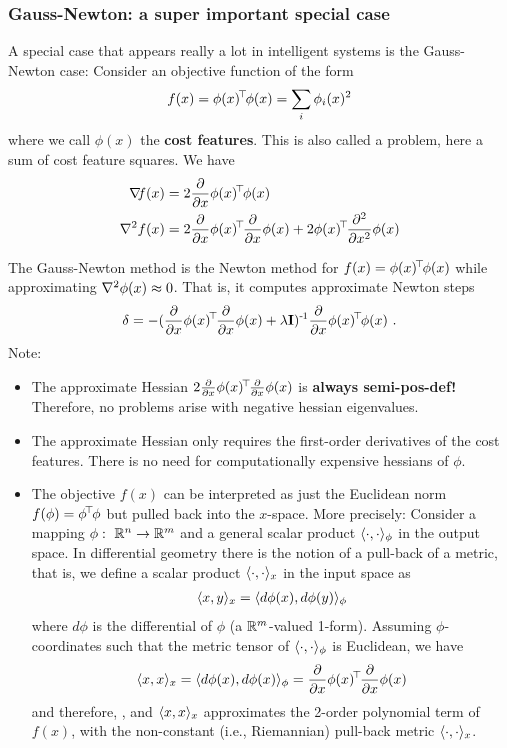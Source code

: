 \subsubsection{Gauss-Newton: a super important special case}

A special case that appears really a lot in intelligent systems is the
Gauss-Newton case: Consider an objective function of the form
\begin{align}
f(x) = \phi(x)^{\!\top\!} \phi(x) = \sum_i \phi_i(x)^2
\end{align}
where we call $\phi(x)$ the \textbf{cost features}. This is also
called a  problem, here a sum of cost feature
squares. We have
\begin{align}
\na f(x)
 &= 2 \Del{x}\phi(x)^\T \phi(x) \\
\he f(x)
 &= 2 \Del{x}\phi(x)^\T \Del{x}\phi(x) +
 2 \phi(x)^\T \Hes{x}\phi(x)
\end{align}

The Gauss-Newton method is the Newton method for         
$f(x) = \phi(x)^{\!\top\!} \phi(x)$ while approximating ${\nabla_{\!\!}^2} \phi(x)\approx
0$. That is, it computes approximate Newton steps 
\begin{equation}
{\delta} = - (\frac{\partial}{\partial x}\phi(x)^{\!\top\!} \frac{\partial}{\partial x}\phi(x) + \lambda {\rm\bf I})^{{\hspace*{-.0pt}\text{\rm -}\hspace*{-.5pt}}1} \frac{\partial}{\partial x}\phi(x)^{\!\top\!} \phi(x) ~.
\end{equation}
Note:
\begin{itemize}
\item The approximate Hessian $2\frac{\partial}{\partial x}\phi(x)^{\!\top\!} \frac{\partial}{\partial x}\phi(x)$
is \textbf{always semi-pos-def!} Therefore, no problems arise with
negative hessian eigenvalues.
\item The approximate Hessian only requires the first-order
derivatives of the cost features. There is no need for
computationally expensive hessians of $\phi$.
\item The objective $f(x)$ can be interpreted as just the Euclidean
norm $f(\phi) = \phi^{\!\top\!} \phi$ but pulled back into the $x$-space. More
precisely: Consider a mapping $\phi:~ {\mathbb{R}}^n \to {\mathbb{R}}^m$ and a general
scalar product $\langle\cdot,\cdot\rangle_\phi$ in the output space. In differential geometry
there is the notion of a pull-back of a metric, that is, we define a
scalar product $\langle\cdot,\cdot\rangle_x$ in the input space as
\begin{align}
\langle x,y\rangle_x = \langle d\phi(x),d\phi(y)\rangle_\phi
\end{align}
where $d\phi$ is the differential of $\phi$ (a ${\mathbb{R}}^m$-valued
1-form). Assuming $\phi$-coordinates such that the metric tensor of
$\langle\cdot,\cdot\rangle_\phi$ is Euclidean, we have
\begin{align}
\langle x,x\rangle_x = \langle d\phi(x),d\phi(x)\rangle_\phi = \frac{\partial}{\partial x}\phi(x)^{\!\top\!} \frac{\partial}{\partial x}\phi(x)
\end{align}
and therefore, , and $\langle x,x\rangle_x$
approximates the 2-order polynomial term of $f(x)$, with the
non-constant (i.e., Riemannian) pull-back metric $\langle\cdot,\cdot\rangle_x$.
\end{itemize}

